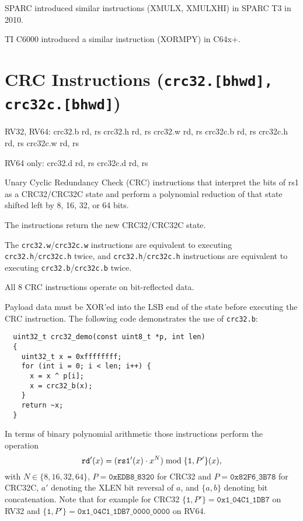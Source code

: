SPARC introduced similar instructions (XMULX, XMULXHI) in SPARC T3 in 2010.~\cite{sparct3}

TI C6000 introduced a similar instruction (XORMPY) in C64x+.~\cite{c64xp}


\section{CRC Instructions (\texttt{crc32.[bhwd], crc32c.[bhwd]})}

\begin{rvb}
  RV32, RV64:
    crc32.b rd, rs
    crc32.h rd, rs
    crc32.w rd, rs
    crc32c.b rd, rs
    crc32c.h rd, rs
    crc32c.w rd, rs

  RV64 only:
    crc32.d rd, rs
    crc32c.d rd, rs
\end{rvb}

Unary Cyclic Redundancy Check (CRC) instructions that interpret the bits of rs1
as a CRC32/CRC32C state and perform a polynomial reduction of that state
shifted left by 8, 16, 32, or 64 bits.

The instructions return the new CRC32/CRC32C state.

The \texttt{crc32.w}/\texttt{crc32c.w} instructions are equivalent to executing
\texttt{crc32.h}/\texttt{crc32c.h} twice, and \texttt{crc32.h}/\texttt{crc32c.h}
instructions are equivalent to executing \texttt{crc32.b}/\texttt{crc32c.b}
twice.

All 8 CRC instructions operate on bit-reflected data.



Payload data must be XOR'ed into the LSB end of the state before executing the
CRC instruction. The following code demonstrates the use of \texttt{crc32.b}:

\begin{minipage}{\linewidth}
\begin{verbatim}
  uint32_t crc32_demo(const uint8_t *p, int len)
  {
    uint32_t x = 0xffffffff;
    for (int i = 0; i < len; i++) {
      x = x ^ p[i];
      x = crc32_b(x);
    }
    return ~x;
  }
\end{verbatim}
\end{minipage}

In terms of binary polynomial arithmetic those instructions perform the operation
$$ \texttt{rd}'(x) = (\texttt{rs1}'(x) \cdot x^N) \; \textrm{mod} \; \{\texttt{1}, P'\}(x)\textrm, $$
with $N \in \{8, 16, 32, 64\}$,
$P = \texttt{0xEDB8\_8320}$ for CRC32 and $P = \texttt{0x82F6\_3B78}$ for CRC32C,
$a'$ denoting the XLEN bit reversal of $a$,
and $\{a, b\}$ denoting bit concatenation.
Note that for example for CRC32 $\{\texttt{1}, P'\} = \texttt{0x1\_04C1\_1DB7}$
on RV32 and $\{\texttt{1}, P'\} = \texttt{0x1\_04C1\_1DB7\_0000\_0000}$ on RV64.

